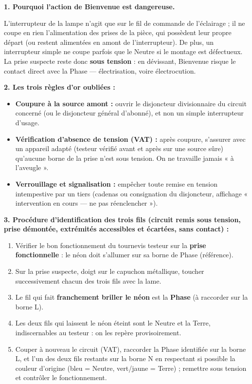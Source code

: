 \documentclass[11pt]{article}
\begin{document}
\begin{corrige}
\textbf{1. Pourquoi l'action de Bienvenue est dangereuse.}

L'interrupteur de la lampe n'agit que sur le fil de commande de l'éclairage ; il ne coupe en rien l'alimentation des prises de la pièce, qui possèdent leur propre départ (ou restent alimentées en amont de l'interrupteur). De plus, un interrupteur simple ne coupe parfois que le Neutre si le montage est défectueux. La prise suspecte reste donc \textbf{sous tension} : en dévissant, Bienvenue risque le contact direct avec la Phase — électrisation, voire électrocution.

\textbf{2. Les trois règles d'or oubliées :}
\begin{itemize}
\item \textbf{Coupure à la source amont :} ouvrir le disjoncteur divisionnaire du circuit concerné (ou le disjoncteur général d'abonné), et non un simple interrupteur d'usage.
\item \textbf{Vérification d'absence de tension (VAT) :} après coupure, s'assurer avec un appareil adapté (testeur vérifié avant et après sur une source sûre) qu'aucune borne de la prise n'est sous tension. On ne travaille jamais « à l'aveugle ».
\item \textbf{Verrouillage et signalisation :} empêcher toute remise en tension intempestive par un tiers (cadenas ou consignation du disjoncteur, affichage « intervention en cours — ne pas réenclencher »).
\end{itemize}

\textbf{3. Procédure d'identification des trois fils (circuit remis sous tension, prise démontée, extrémités accessibles et écartées, sans contact) :}
\begin{enumerate}
\item Vérifier le bon fonctionnement du tournevis testeur sur la \textbf{prise fonctionnelle} : le néon doit s'allumer sur sa borne de Phase (référence).
\item Sur la prise suspecte, doigt sur le capuchon métallique, toucher successivement chacun des trois fils avec la lame.
\item Le fil qui fait \textbf{franchement briller le néon} est la \textbf{Phase} (à raccorder sur la borne L).
\item Les deux fils qui laissent le néon éteint sont le Neutre et la Terre, indiscernables au testeur : on les repère provisoirement.
\item Couper à nouveau le circuit (VAT), raccorder la Phase identifiée sur la borne L, et l'un des deux fils restants sur la borne N en respectant si possible la couleur d'origine (bleu = Neutre, vert/jaune = Terre) ; remettre sous tension et contrôler le fonctionnement.
\end{enumerate}


\end{corrige}
\end{document}
